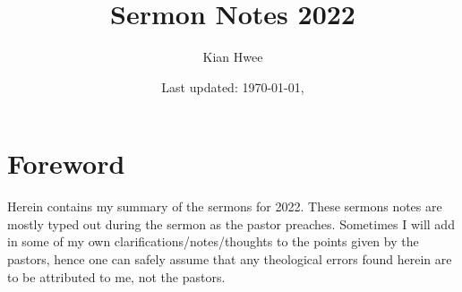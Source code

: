 \documentclass[12pt, a4paper]{article} %
\title{Sermon Notes 2022}
\author{Kian Hwee}
\date{\small Last updated: \today, \currenttime} %
\numberwithin{equation}{section} %
\theoremstyle{plain}
\theoremstyle{remark}
\theoremstyle{plain}
\theoremstyle{definition}
\theoremstyle{remark}
\begin{document}
  \maketitle
  \section*{Foreword}
    Herein contains my summary of the sermons for 2022.  These sermons notes
    are mostly typed out during the sermon as the pastor preaches.  Sometimes
    I will add in some of my own clarifications/notes/thoughts to the points
    given by the pastors, hence one can safely assume that any theological
    errors found herein are to be attributed to me, not the pastors. 
  \tableofcontents %
  
  
  
  
  
  
  
  
  
  
  
  
  
  
  
  
  
  
  
  
  
  
  
  
  
  
  
  
  
\end{document}

